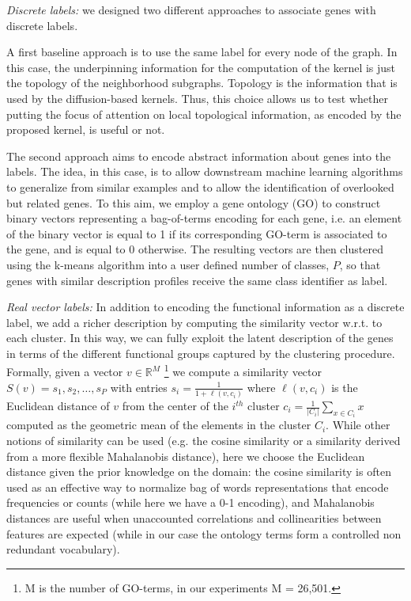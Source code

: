 \documentclass[review]{elsarticle}
\begin{document}
\textit{Discrete labels:} we designed two different approaches to associate genes with discrete labels.

A first baseline approach is to use the same label for every node of the graph. In this case, the underpinning information for the computation of the kernel is just the topology of the neighborhood subgraphs. Topology is the information that is used by the diffusion-based kernels. Thus, this choice allows us to test whether putting the focus of attention on local topological information, as encoded by the proposed kernel, is useful or not.

The second approach aims to encode abstract information about genes into the labels. The idea, in this case, is to allow  downstream machine learning algorithms to generalize from similar examples and to allow the identification of overlooked but related genes. To this aim, we employ a gene ontology (GO) \cite{gene2004gene} to construct binary vectors representing a bag-of-terms encoding for each gene, i.e. an element of the binary vector is equal to 1 if its corresponding GO-term is associated to the gene, and is equal to 0 otherwise. The resulting vectors are then clustered using the k-means algorithm into a user defined number of classes, $P$, so that genes with similar description profiles receive the same class identifier as label.

\textit{Real vector labels:} In addition to encoding the functional information as a discrete label, we add a richer description by computing the similarity vector w.r.t. to each cluster. In this way, we can fully exploit the latent description of the genes in terms of the different functional groups captured by the clustering procedure. Formally, given a vector $v \in \mathbb{R}^{M}$ \footnote{M is the number of GO-terms, in our experiments M = 26,501.} we compute a similarity vector $S(v)= {s_1, s_2, \ldots, s_P}$ with entries $s_i = \frac{1}{1+ \ell(v,c_i)}$ where $\ell(v,c_i)$ is the Euclidean distance of $v$ from the center of the $i^{th}$ cluster $c_i = \frac{1}{|C_i|}\sum_{x \in C_i} x$ computed as the geometric mean of the elements in the cluster $C_i$. While other notions of similarity can be used (e.g. the cosine similarity or a similarity derived from a more flexible  Mahalanobis distance), here we choose the Euclidean distance given the prior knowledge on the domain: the cosine similarity is often used as an effective way to normalize bag of words representations that encode frequencies or counts (while here we have a 0-1 encoding), and Mahalanobis distances are useful when unaccounted correlations and collinearities between features are expected (while in our case the ontology terms form a controlled non redundant vocabulary).
\end{document}
